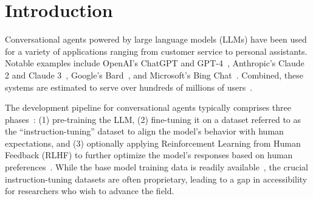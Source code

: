 \documentclass{article} %
\newcommand{\corpus}{\textsc{WildChat}\xspace}
\newcommand{\model}{\textsc{WildLlama}\xspace}
\newcommand{\jack}[1]{{\color{salmon}{[{\bf Jack}: #1]}}}
\begin{document}
\begin{abstract}

\end{abstract}

\section{Introduction}
Conversational agents powered by large language models (LLMs) have been used for a variety of applications ranging from customer service to personal assistants. Notable examples include OpenAI's ChatGPT and GPT-4~\citep{OpenAI2023GPT4TR}, Anthropic's Claude 2 and Claude 3~\citep{bai2022constitutional,Anthropic_2023}, Google's Bard~\citep{Google_2023}, and Microsoft's Bing Chat~\citep{Microsoft_2023}. %
Combined, these systems are estimated to serve over hundreds of millions of users~\citep{DeVynck_2023}. %

The development pipeline for conversational agents typically comprises three phases~\citep{zhou2023lima,touvron2023llama}: (1) pre-training the LLM, (2) fine-tuning it on a dataset referred to as the ``instruction-tuning'' dataset to align the model's behavior with human expectations, and (3) optionally applying Reinforcement Learning from Human Feedback (RLHF) to further optimize the model's responses based on human preferences~\citep{NEURIPS2020_1f89885d,NEURIPS2022_b1efde53,ramamurthy2023is,wu2023finegrained,rafailov2023direct}. While the base model training data is readily available~\citep{dolma}, the crucial instruction-tuning datasets are often proprietary, leading to a gap in accessibility for researchers who wish to advance the field.
\end{document}

